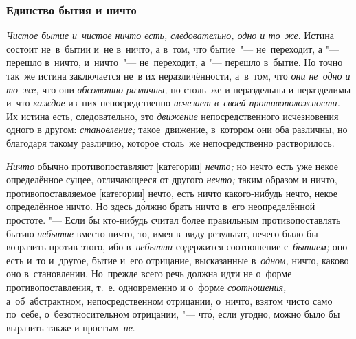 
\subsubsection{Единство бытия и ничто}

{\em Чистое бытие и~чистое ничто есть, следовательно, одно и то~же}. Истина
состоит не~в~бытии и~не в~ничто, а в~том, что бытие~"--- не~переходит, а "---
перешло в~ничто, и~ничто~"--- не~переходит, а "--- перешло в~бытие. Но точно
так~же истина заключается не~в их неразличённости, а~в~том, что
{\em они не~одно и то~же,} что они {\em абсолютно различны,} но столь~же и
нераздельны и неразделимы и~что {\em каждое} из~них непосредственно
{\em исчезает в~своей противоположности.} Их истина есть, следовательно, это
{\em движение} непосредственного исчезновения одного в другом:
{\em становление;} такое~движение, в~котором они оба различны,
но благодаря такому различию, которое столь~же непосредственно растворилось.


{\em Ничто} обычно противопоставляют [категории] {\em нечто;} но нечто есть
уже некое определённое сущее, отличающееся от другого {\em нечто;} таким образом
и ничто, противопоставляемое [категории] нечто, есть ничто какого-нибудь нечто,
некое определённое ничто. Но здесь д\'{о}лжно брать ничто в~его неопределённой
простоте. "--- Если бы кто-нибудь считал более правильным противопоставлять бытию
{\em небытие} вместо ничто, то, имея в~виду результат, нечего было бы возразить
против этого, ибо в~{\em небытии} содержится соотношение с~{\em бытием;} оно
есть и~то и~другое, бытие и~его отрицание, высказанные в~{\em одном,} ничто,
каково оно в~становлении. Но~прежде всего речь должна идти не о~форме
противопоставления, т.~е. одновременно и о~форме {\em соотношения,}
а~об~абстрактном, непосредственном отрицании, о~ничто, взятом чисто само
по~себе, о~безотносительном отрицании, "--- чт\'{о}, если угодно, можно было бы
выразить также и простым~{\em не}.

